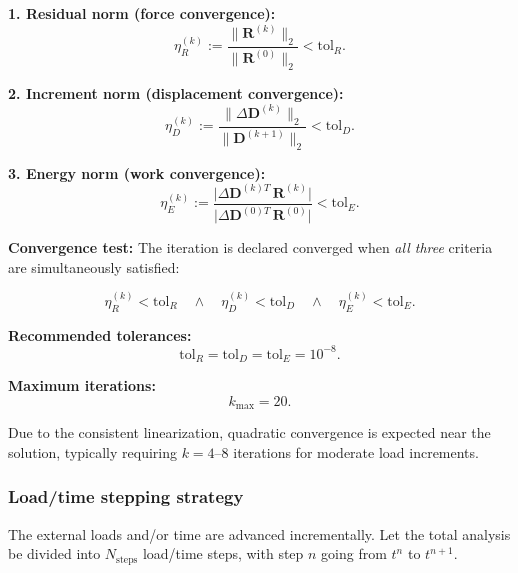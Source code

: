 \documentclass[11pt]{article}
\begin{document}
\textbf{1. Residual norm (force convergence):}
\begin{equation}
\eta_{R}^{(k)}
:= \frac{\|\mathbf{R}^{(k)}\|_{2}}{\|\mathbf{R}^{(0)}\|_{2}}
< \mathrm{tol}_{R}.
\label{s7:conv_residual}
\end{equation}

\textbf{2. Increment norm (displacement convergence):}
\begin{equation}
\eta_{D}^{(k)}
:= \frac{\|\Delta\mathbf{D}^{(k)}\|_{2}}{\|\mathbf{D}^{(k+1)}\|_{2}}
< \mathrm{tol}_{D}.
\label{s7:conv_increment}
\end{equation}

\textbf{3. Energy norm (work convergence):}
\begin{equation}
\eta_{E}^{(k)}
:= \frac{\bigl|\Delta\mathbf{D}^{(k)T}\,\mathbf{R}^{(k)}\bigr|}
        {\bigl|\Delta\mathbf{D}^{(0)T}\,\mathbf{R}^{(0)}\bigr|}
< \mathrm{tol}_{E}.
\label{s7:conv_energy}
\end{equation}

\textbf{Convergence test:} The iteration is declared converged when
\emph{all three} criteria are simultaneously satisfied:

\begin{equation}
\eta_{R}^{(k)}<\mathrm{tol}_{R}
\quad\wedge\quad
\eta_{D}^{(k)}<\mathrm{tol}_{D}
\quad\wedge\quad
\eta_{E}^{(k)}<\mathrm{tol}_{E}.
\label{s7:conv_test}
\end{equation}

\textbf{Recommended tolerances:}
\begin{equation}
\mathrm{tol}_{R}=\mathrm{tol}_{D}=\mathrm{tol}_{E}=10^{-8}.
\label{s7:tol_recommended}
\end{equation}

\textbf{Maximum iterations:}
\begin{equation}
k_{\max}=20.
\label{s7:kmax}
\end{equation}

Due to the consistent linearization, quadratic convergence is expected
near the solution, typically requiring $k=4$--$8$ iterations for
moderate load increments.

\subsubsection{Load/time stepping strategy}
\label{ssec:stepping}

The external loads and/or time are advanced incrementally. Let the
total analysis be divided into $N_{\mathrm{steps}}$ load/time steps,
with step $n$ going from $t^{n}$ to $t^{n+1}$.
\end{document}
